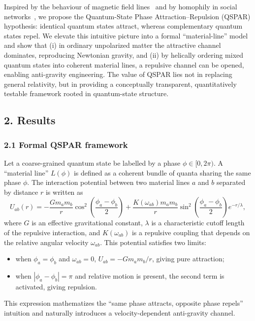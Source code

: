 \documentclass[12pt,a4paper]{article}
\begin{document}
Inspired by the behaviour of magnetic field lines~\cite{parker1979} and by homophily in social networks~\cite{mcpherson2001}, we propose the Quantum-State Phase Attraction--Repulsion (QSPAR) hypothesis: identical quantum states attract, whereas complementary quantum states repel. We elevate this intuitive picture into a formal ``material-line'' model and show that (i) in ordinary unpolarized matter the attractive channel dominates, reproducing Newtonian gravity, and (ii) by helically ordering mixed quantum states into coherent material lines, a repulsive channel can be opened, enabling anti-gravity engineering. The value of QSPAR lies not in replacing general relativity, but in providing a conceptually transparent, quantitatively testable framework rooted in quantum-state structure.

\subsection*{2. Results}

\subsubsection*{2.1 Formal QSPAR framework}

Let a coarse-grained quantum state be labelled by a phase $\phi \in [0, 2\pi)$. A ``material line'' $L(\phi)$ is defined as a coherent bundle of quanta sharing the same phase $\phi$. The interaction potential between two material lines $a$ and $b$ separated by distance $r$ is written as
\begin{equation}
U_{ab}(r) = -\frac{G m_a m_b}{r}\cos^2\!\left(\frac{\phi_a-\phi_b}{2}\right)
            +\frac{K(\omega_{ab}) m_a m_b}{r}\sin^2\!\left(\frac{\phi_a-\phi_b}{2}\right)e^{-r/\lambda},
\label{eq:qspar}
\end{equation}
where $G$ is an effective gravitational constant, $\lambda$ is a characteristic cutoff length of the repulsive interaction, and $K(\omega_{ab})$ is a repulsive coupling that depends on the relative angular velocity $\omega_{ab}$. This potential satisfies two limits:
\begin{itemize}
  \item when $\phi_a=\phi_b$ and $\omega_{ab}=0$, $U_{ab}=-Gm_am_b/r$, giving pure attraction;
  \item when $|\phi_a-\phi_b|=\pi$ and relative motion is present, the second term is activated, giving repulsion.
\end{itemize}
This expression mathematizes the ``same phase attracts, opposite phase repels'' intuition and naturally introduces a velocity-dependent anti-gravity channel.
\end{document}
